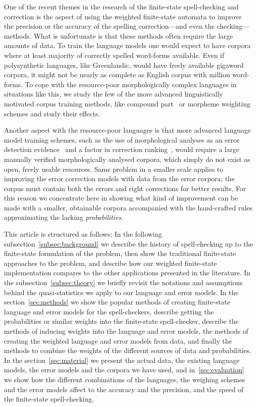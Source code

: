 \documentclass[a4paper,12pt]{article}
\begin{document}
One of the recent themes in the research of the finite-state spell-checking and
correction is the aspect of using the weighted finite-state automata to improve
the precision or the accuracy of the spelling correction---and even the
checking--- methods. What is unfortunate is that these methods often require
the large amounts of data. To train the language models one would expect to
have corpora where at least majority of correctly spelled word-forms available.
Even if polysynthetic languages, like Greenlandic, would have freely available
gigaword corpora, it might not be nearly as complete as English corpus with
million word-forms. To cope with the resource-poor morphologically complex
languages in situations like this, we study the few of the more advanced
linguistically motivated corpus training methods, like compound
part~\cite[]{pirinen/2009/nodalida} or morpheme weighting schemes and study
their effects.

Another aspect with the resource-poor languages is that more advanced language
model training schemes, such as the use of morphological analyses as an error
detection evidence~\cite[]{mays/1991} and a factor in correction
ranking~\cite[]{otero/2007}, would require a large manually verified
morphologically analysed corpora, which simply do not exist as open, freely
usable resources. Same problem in a smaller scale applies to improving the
error correction models with data from the error corpora; the corpus must
contain both the errors and right corrections for better results. For this
reason we concentrate here in showing what kind of improvement can be made with
a smaller, obtainable corpora accompanied with the hand-crafted rules
approximating the lacking \emph{probabilities}.

This article is structured as follows: In the following
subsection~\ref{subsec:background} we describe the history of spell-checking up
to the finite-state formulation of the problem, then show the traditional
finite-state approaches to the problem, and describe how our weighted
finite-state implementation compares to the other applications presented in the
literature.  In the subsection~\ref{subsec:theory} we briefly revisit the
notations and assumptions behind the quasi-statistics we apply to our language
and error models.  In the section~\ref{sec:methods} we show the popular methods
of creating finite-state language and error models for the spell-checkers,
describe getting the probabilities or similar weights into the finite-state
spell-checker, describe the methods of inducing weights into the language and
error models, the methods of creating the weighted language and error models
from data, and finally the methods to combine the weights of the different
sources of data and probabilities. In the section~\ref{sec:material} we present
the actual data, the existing language models, the error models and the corpora
we have used, and in~\ref{sec:evaluation} we show how the different
combinations of the languages, the weighing schemes and the error models affect
to the accuracy and the precision, and the speed of the finite-state
spell-checking.
\end{document}
